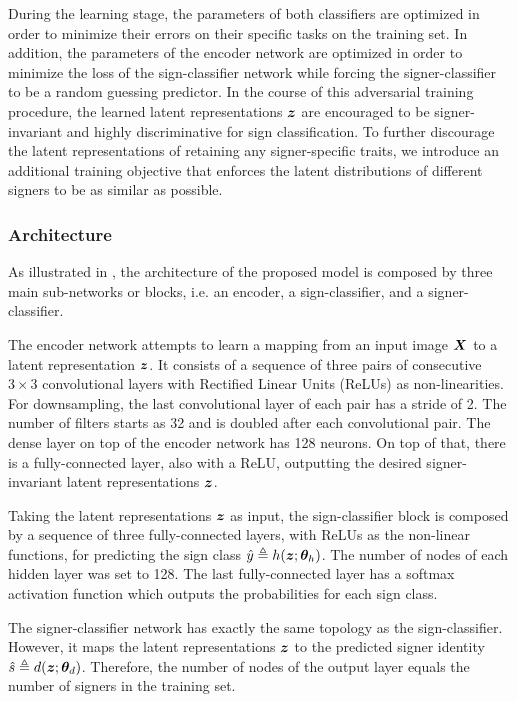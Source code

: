 During the learning stage, the parameters of both classifiers are optimized in order to minimize their errors on their specific tasks on the training set. In addition, the parameters of the encoder network are optimized in order to minimize the loss of the sign-classifier network while forcing the signer-classifier to be a random guessing predictor. In the course of this adversarial training procedure, the learned latent representations ${\bm{z}}$ are encouraged to be signer-invariant and highly discriminative for sign classification. To further discourage the latent representations of retaining any signer-specific traits, we introduce an additional training objective that enforces the latent distributions of different signers to be as similar as possible.

\subsubsection{Architecture}
As illustrated in , the architecture of the proposed model is composed by three main sub-networks or blocks, i.e. an encoder, a sign-classifier, and a signer-classifier.

The encoder network attempts to learn a mapping from an input image ${\bm{X}}$ to a latent representation ${\bm{z}}$. It consists of a sequence of three pairs of consecutive $3\times 3$ convolutional layers with Rectified  Linear  Units (ReLUs) as non-linearities. For downsampling, the last convolutional layer of each pair has a stride of 2. The number of filters starts as 32 and is doubled after each convolutional pair. The dense layer on top of the encoder network has 128 neurons. On top of that, there is a fully-connected layer, also with a ReLU, outputting the desired signer-invariant latent representations ${\bm{z}}$.

Taking the latent representations ${\bm{z}}$ as input, the sign-classifier block is composed by a sequence of three fully-connected layers, with ReLUs as the non-linear functions, for predicting the sign class $\hat{y} \triangleq h({\bm{z}}; {\bm{\theta}}_h)$. The number of nodes of each hidden layer was set to 128. The last fully-connected layer has a softmax activation function which outputs the probabilities for each sign class.

The signer-classifier network has exactly the same topology as the sign-classifier. However, it maps the latent representations ${\bm{z}}$ to the predicted signer identity $\hat{s} \triangleq d({\bm{z}}; {\bm{\theta}}_d)$. Therefore, the number of nodes of the output layer equals the number of signers in the training set.

